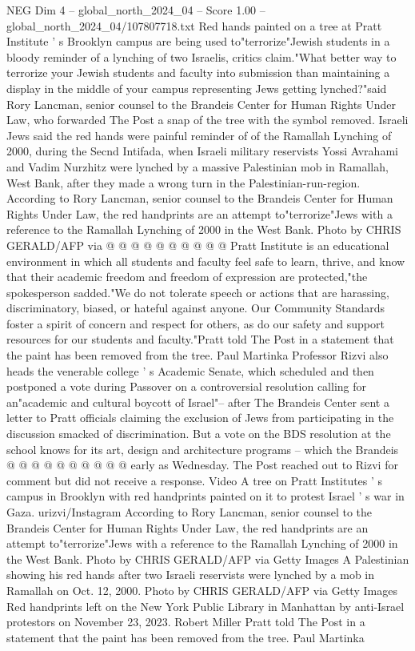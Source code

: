 \begin{textsample}{NEG Dim 4 – global\_north\_2024\_04 – Score 1.00 – global\_north\_2024\_04/107807718.txt}  \label{ex:f4_neg_100}
Red hands painted on a tree at Pratt Institute ' s Brooklyn campus are being used to"terrorize"Jewish students in a bloody reminder of a lynching of two Israelis, critics claim."What better way to terrorize your Jewish students and faculty into submission than maintaining a display in the middle of your campus representing Jews getting lynched?"said Rory Lancman, senior counsel to the Brandeis Center for Human Rights Under Law, who forwarded The Post a snap of the tree with the symbol removed.
Israeli Jews said the red hands were painful reminder of of the Ramallah Lynching of 2000, during the Secnd Intifada, when Israeli military reservists Yossi Avrahami and Vadim Nurzhitz were lynched by a massive Palestinian mob in Ramallah, West Bank, after they made a wrong turn in the Palestinian-run-region.
According to Rory Lancman, senior counsel to the Brandeis Center for Human Rights Under Law, the red handprints are an attempt to"terrorize"Jews with a reference to the Ramallah Lynching of 2000 in the West Bank.
Photo by CHRIS GERALD/AFP via @ @ @ @ @ @ @ @ @ @ Pratt Institute is an educational environment in which all students and faculty feel safe to learn, thrive, and know that their academic freedom and freedom of expression are protected,"the spokesperson sadded."We do not tolerate speech or actions that are harassing, discriminatory, biased, or hateful against anyone.
Our Community Standards foster a spirit of concern and respect for others, as do our safety and support resources for our students and faculty."Pratt told The Post in a statement that the paint has been removed from the tree.
Paul Martinka Professor Rizvi also heads the venerable college ' s Academic Senate, which scheduled and then postponed a vote during Passover on a controversial resolution calling for an"academic and cultural boycott of Israel"-- after The Brandeis Center sent a letter to Pratt officials claiming the exclusion of Jews from participating in the discussion smacked of discrimination.
But a vote on the BDS resolution at the school knows for its art, design and architecture programs -- which the Brandeis @ @ @ @ @ @ @ @ @ @ early as Wednesday.
The Post reached out to Rizvi for comment but did not receive a response.
Video A tree on Pratt Institutes ' s campus in Brooklyn with red handprints painted on it to protest Israel ' s war in Gaza. urizvi/Instagram According to Rory Lancman, senior counsel to the Brandeis Center for Human Rights Under Law, the red handprints are an attempt to"terrorize"Jews with a reference to the Ramallah Lynching of 2000 in the West Bank.
Photo by CHRIS GERALD/AFP via Getty Images A Palestinian showing his red hands after two Israeli reservists were lynched by a mob in Ramallah on Oct. 12, 2000.
Photo by CHRIS GERALD/AFP via Getty Images Red handprints left on the New York Public Library in Manhattan by anti-Israel protestors on November 23, 2023.
Robert Miller Pratt told The Post in a statement that the paint has been removed from the tree.
Paul Martinka

\end{textsample}
